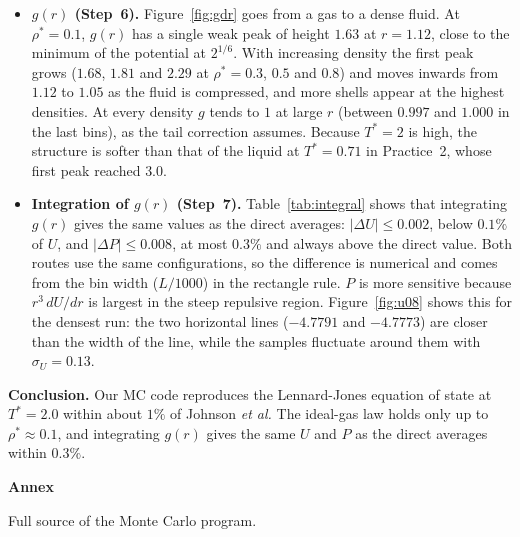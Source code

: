 \begin{itemize}
  \item \textbf{$g(r)$ (Step~6).} Figure~\ref{fig:gdr} goes from a gas to a dense fluid. At $\rho^*=0.1$, $g(r)$ has a single weak peak of height $1.63$ at $r=1.12$, close to the minimum of the potential at $2^{1/6}$. With increasing density the first peak grows ($1.68$, $1.81$ and $2.29$ at $\rho^*=0.3$, $0.5$ and $0.8$) and moves inwards from $1.12$ to $1.05$ as the fluid is compressed, and more shells appear at the highest densities. At every density $g$ tends to $1$ at large $r$ (between $0.997$ and $1.000$ in the last bins), as the tail correction assumes. Because $T^*=2$ is high, the structure is softer than that of the liquid at $T^*=0.71$ in Practice~2, whose first peak reached $3.0$.

  \item \textbf{Integration of $g(r)$ (Step~7).} Table~\ref{tab:integral} shows that integrating $g(r)$ gives the same values as the direct averages: $|\Delta U|\le0.002$, below $0.1\%$ of $U$, and $|\Delta P|\le0.008$, at most $0.3\%$ and always above the direct value. Both routes use the same configurations, so the difference is numerical and comes from the bin width ($L/1000$) in the rectangle rule. $P$ is more sensitive because $r^3\,dU/dr$ is largest in the steep repulsive region. Figure~\ref{fig:u08} shows this for the densest run: the two horizontal lines ($-4.7791$ and $-4.7773$) are closer than the width of the line, while the samples fluctuate around them with $\sigma_U=0.13$.
\end{itemize}

\textbf{Conclusion.} Our MC code reproduces the Lennard-Jones equation of state at $T^*=2.0$ within about $1\%$ of Johnson \emph{et al.} The ideal-gas law holds only up to $\rho^*\approx0.1$, and integrating $g(r)$ gives the same $U$ and $P$ as the direct averages within $0.3\%$.

\clearpage
\thispagestyle{empty}
\null
\vspace*{\fill}
\begin{center}
{\fontsize{48}{58}\selectfont\bfseries Annex}
\end{center}
\vspace*{\fill}
\clearpage
Full source of the Monte Carlo program.



